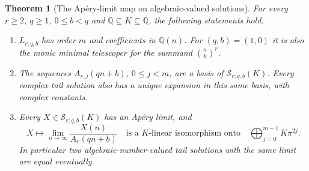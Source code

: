 \documentclass[11pt,a4paper]{article}
\newtheorem{theorem}{Theorem}[section]
\theoremstyle{definition}
\theoremstyle{remark}
\numberwithin{equation}{section}
\begin{document}
\begin{theorem}[The Ap\'ery-limit map on algebraic-valued solutions]
\label{E:ac:apery}
For every $r\ge2$, $q\ge1$, $0\le b<q$ and
$\mathbb Q\subseteq K\subseteq\overline{\mathbb Q}$, the following
statements hold.
\begin{enumerate}
\item $L_{r;q,b}$ has order $m$ and coefficients in $\mathbb Q(n)$.
For $(q,b)=(1,0)$ it is also the monic minimal telescoper for the
summand $\binom nk^r$.
\item The sequences $A_{r,j}(qn+b)$, $0\le j<m$, are a basis of
$\mathcal S_{r;q,b}(K)$. Every complex tail solution also has a
unique expansion in this same basis, with complex constants.
\item Every $X\in\mathcal S_{r;q,b}(K)$ has an Ap\'ery limit, and
\begin{equation}\label{E:ac:limit-isomorphism}
 X\longmapsto \lim_{n\to\infty}\frac{X(n)}{A_r(qn+b)}
 \quad\text{is a $K$-linear isomorphism onto}\quad
 \bigoplus_{j=0}^{m-1}K\pi^{2j}.
\end{equation}
In particular two algebraic-number-valued tail solutions with the
same limit are equal eventually.
\end{enumerate}
\end{theorem}
\end{document}
